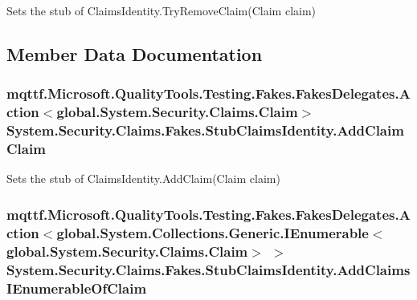 Sets the stub of Claims\-Identity.\-Try\-Remove\-Claim(\-Claim claim)



\subsection{Member Data Documentation}
\hypertarget{class_system_1_1_security_1_1_claims_1_1_fakes_1_1_stub_claims_identity_a8e97bf3ea7bfa11897cd8e86224c5be0}{
\subsubsection[{Add\-Claim\-Claim}]{\setlength{\rightskip}{0pt plus 5cm}mqttf.\-Microsoft.\-Quality\-Tools.\-Testing.\-Fakes.\-Fakes\-Delegates.\-Action$<$global.\-System.\-Security.\-Claims.\-Claim$>$ System.\-Security.\-Claims.\-Fakes.\-Stub\-Claims\-Identity.\-Add\-Claim\-Claim}}\label{class_system_1_1_security_1_1_claims_1_1_fakes_1_1_stub_claims_identity_a8e97bf3ea7bfa11897cd8e86224c5be0}


Sets the stub of Claims\-Identity.\-Add\-Claim(\-Claim claim)

\hypertarget{class_system_1_1_security_1_1_claims_1_1_fakes_1_1_stub_claims_identity_a3bac0eb870f33a93ccd0e4724533e751}{
\subsubsection[{Add\-Claims\-I\-Enumerable\-Of\-Claim}]{\setlength{\rightskip}{0pt plus 5cm}mqttf.\-Microsoft.\-Quality\-Tools.\-Testing.\-Fakes.\-Fakes\-Delegates.\-Action$<$global.\-System.\-Collections.\-Generic.\-I\-Enumerable$<$global.\-System.\-Security.\-Claims.\-Claim$>$ $>$ System.\-Security.\-Claims.\-Fakes.\-Stub\-Claims\-Identity.\-Add\-Claims\-I\-Enumerable\-Of\-Claim}}\label{class_system_1_1_security_1_1_claims_1_1_fakes_1_1_stub_claims_identity_a3bac0eb870f33a93ccd0e4724533e751}


